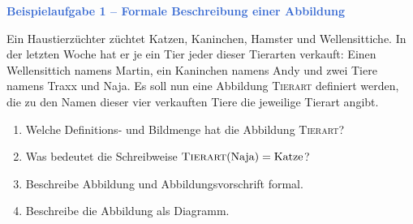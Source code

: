 \documentclass[../abbildungen.tex]{subfiles}
\begin{document}
    \textcolor{highlight}{\textbf{Beispielaufgabe 1 -- Formale Beschreibung einer Abbildung}}
    
    Ein Haustierzüchter züchtet Katzen, Kaninchen, Hamster und Wellensittiche. In der letzten Woche hat er je ein Tier jeder dieser Tierarten verkauft: Einen Wellensittich namens Martin, ein Kaninchen namens Andy und zwei Tiere namens Traxx und Naja. Es soll nun eine Abbildung \textsc{Tierart} definiert werden, die zu den Namen dieser vier verkauften Tiere die jeweilige Tierart angibt.
    
    \begin{enumerate}[label=\textcolor{highlight}{\alph*)}]
        \item Welche Definitions- und Bildmenge hat die Abbildung \textsc{Tierart}?
        \item Was bedeutet die Schreibweise $\textsc{Tierart}(\text{Naja})=\text{Katze}$?
        \item Beschreibe Abbildung und Abbildungsvorschrift formal.
        \item Beschreibe die Abbildung als Diagramm.
    \end{enumerate}
    
\end{document}
